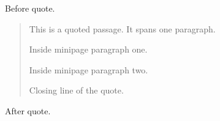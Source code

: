 Before quote.

\begin{quote}
This is a quoted passage. It spans one paragraph.

\begin{minipage}{0.5\linewidth}
Inside minipage paragraph one.

Inside minipage paragraph two.
\end{minipage}

Closing line of the quote.
\end{quote}

After quote.
